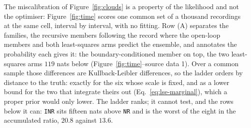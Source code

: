 The miscalibration of Figure~\ref{fig:clouds} is a property of the likelihood and not the optimiser:
Figure~\ref{fig:time} scores one common set of a thousand recordings at the same cell, interval by
interval, with no fitting. Row (A) separates the families, the recursive members following the
record where the open-loop members and both least-squares arms predict the ensemble, and annotates
the probability each gives it: the boundary-conditioned member on top, the two least-squares arms
$119$ nats below (Figure~\ref{fig:time}--source data 1). Over a common sample those differences are
Kullback-Leibler differences, so the ladder orders by distance to the truth: exactly for the six
whose scale is fixed, and as a lower bound for the two that integrate theirs out
(Eq.~\ref{eq:lse-marginal}), which a proper prior would only lower. The ladder ranks; it cannot
test, and the rows below it can: \texttt{INR} sits fifteen nats above \texttt{NR} and is the worst
of the eight in the accumulated ratio, $20.8$ against $13.6$.
